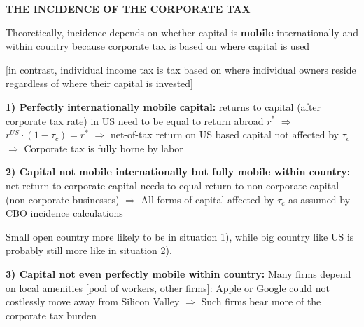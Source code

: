 \documentclass[landscape]{slides}
\begin{document}
%

%
%
%
%
%

\begin{slide}
\begin{center}
{\bf THE INCIDENCE OF THE CORPORATE TAX}
\end{center}
Theoretically, incidence depends on whether capital is \textbf{mobile} internationally and within country because
corporate tax is based on where capital is used

\small
[in contrast, individual income tax is tax
based on where individual owners reside regardless of where their capital is invested]

\textbf{1) Perfectly internationally mobile capital:} returns to capital (after corporate tax rate) in US need to be equal
to return abroad $r^*$ $\Rightarrow$ $r^{US} \cdot (1-\tau_c)=r^*$
$\Rightarrow$ net-of-tax return on US based capital not affected by $\tau_c$ $\Rightarrow$ Corporate tax
is fully borne by labor

\textbf{2) Capital not mobile internationally but fully mobile within country:} net return to corporate capital needs to equal return to non-corporate
capital (non-corporate businesses) $\Rightarrow$ All forms of capital affected by $\tau_c$ as assumed by CBO
incidence calculations

Small open country more likely to be in situation 1), while big country like US is probably still more like in situation 2).

\textbf{3) Capital not even perfectly mobile within country:} Many firms depend on local amenities [pool of workers, other firms]: Apple or Google could not costlessly move away
from Silicon Valley $\Rightarrow$ Such firms bear more of the corporate tax burden


\end{slide}
\end{document}
